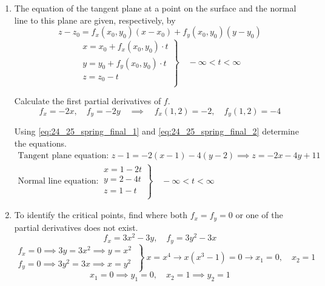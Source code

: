 \documentclass[a4paper, 12pt]{article}
\begin{document}
\newpage
{}
{}



\begin{enumerate}[leftmargin=*,label=\textbf{\arabic*.}]
\item The equation of the tangent plane at a point on the surface and the normal line to this plane are given, respectively, by
\begin{equation}z-z_0=f_x(x_0,y_0)(x-x_0)+f_y(x_0,y_0)(y-y_0)\label{eq:24_25_spring_final_1}\end{equation}
\begin{equation}
\left.\begin{array}{c}
x=x_0+f_x(x_0,y_0)\cdot t\\
y=y_0+f_y(x_0,y_0)\cdot t\\
z=z_0- t\\
\end{array}\right\}\quad-\infty<t<\infty\label{eq:24_25_spring_final_2}
\end{equation}

Calculate the first partial derivatives of $f$.
\[f_x=-2x,\quad f_y=-2y\quad\implies\quad f_x(1,2)=-2,\quad f_y(1,2)=-4\]

Using \eqref{eq:24_25_spring_final_1} and \eqref{eq:24_25_spring_final_2} determine the equations.
\[\boxed{\begin{array}{l}
\text{Tangent plane equation: } z-1=-2(x-1)-4(y-2)\implies z=-2x-4y+11\\
\text{Normal line equation:}\:\left.\begin{array}{l}
x=1-2t\\
y=2-4t\\
z=1-t\\
\end{array}\right\}\quad-\infty<t<\infty
\end{array}
}
\]

\item To identify the critical points, find where both $f_x=f_y=0$ or one of the partial derivatives does not exist.
\vspace{-1em} %
\[f_x=3x^2-3y,\quad f_y=3y^2-3x\]
\[\left.\begin{array}{c}
f_x=0\implies 3y=3x^2\implies y=x^2\\
f_y=0\implies 3y^2=3x\implies x=y^2 
\end{array}\:\right\}\: x=x^4\rightarrow x(x^3-1)=0\rightarrow x_1=0,\quad x_2=1\]
\[x_1=0\implies y_1=0,\quad x_2=1\implies y_2=1\]


\end{enumerate}
\end{document}
